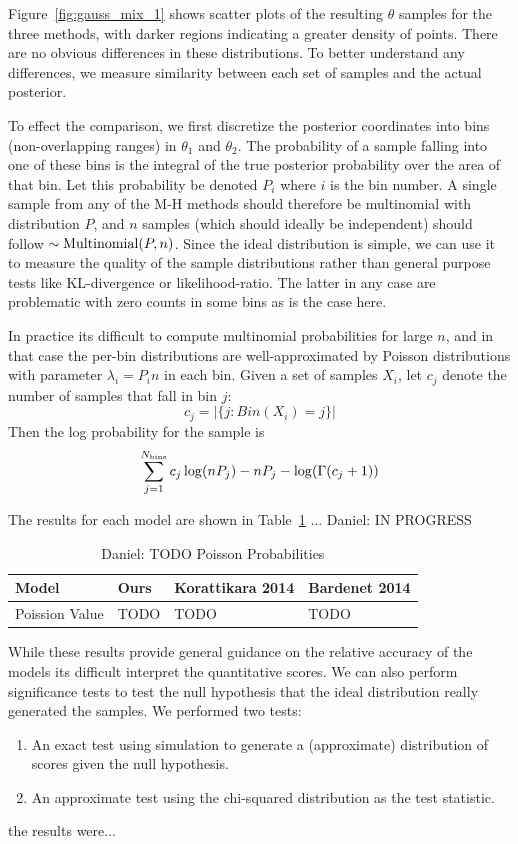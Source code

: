 \documentclass{article}
\begin{document}
Figure~\ref{fig:gauss_mix_1} shows scatter plots of the resulting $\theta$
samples for the three methods, with darker regions indicating a greater density
of points. There are no obvious differences in these distributions. To
better understand any differences, we measure similarity between each set
of samples and the actual posterior. 

To effect the comparison, we first discretize the posterior
coordinates into bins (non-overlapping ranges) in $\theta_1$ and
$\theta_2$. The probability of a sample falling into one of these bins
is the integral of the true posterior probability over the area of
that bin. Let this probability be denoted $P_i$ where $i$ is the bin
number. A single sample from any of the M-H methods should therefore
be multinomial with distribution $P$, and $n$ samples (which should
ideally be independent) should follow $\sim {\rm Multinomial}(P,n)$.
Since the ideal distribution is simple, we can use it to measure the
quality of the sample distributions rather than general purpose tests
like KL-divergence or likelihood-ratio.  The latter in any case are
problematic with zero counts in some bins as is the case here.

In practice its difficult to compute multinomial probabilities for
large $n$, and in that case the per-bin distributions are
well-approximated by Poisson distributions with parameter
$\lambda_i=P_i n$ in each bin. Given a set of samples $X_i$, let
$c_j$ denote the number of samples that fall in bin $j$:
$$c_j = |\{j : Bin(X_i) = j\}|$$
Then the log probability for the sample is
\begin{equation}
  \sum_{j=1}^{N_{\rm bins}} c_j \log (n P_j) - n P_j - \log(\Gamma(c_j+1))
\end{equation}

The results for each model are shown in Table~\ref{tab:poissons} ...
{\color{blue} Daniel: IN PROGRESS}

\begin{table}[t]
    \caption{{\color{blue} Daniel: TODO Poisson Probabilities}}
    \label{tab:poissons}
    \centering
    \begin{tabular}{l l l l}
    \toprule
    Model & Ours & Korattikara 2014 & Bardenet 2014 \\
    \midrule
    Poission Value & TODO & TODO & TODO \\
    \bottomrule
    \end{tabular}
\end{table}


While these results provide general guidance on the relative accuracy of the models
its difficult interpret the quantitative scores. We can also perform significance tests to
test the null hypothesis that the ideal distribution really generated the samples.
We performed two tests:
\begin{enumerate}
  \item An exact test using simulation to generate a (approximate) distribution
    of scores given the null hypothesis.
  \item An approximate test using the chi-squared distribution
    as the test statistic. 
\end{enumerate}
the results were...
\end{document}
